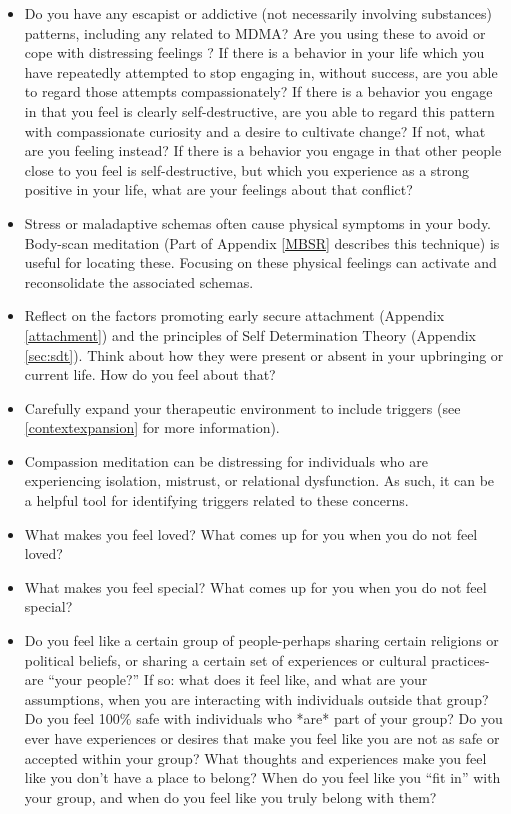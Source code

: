 \documentclass[12pt,letterpaper]{article}
\begin{document}
\begin{itemize}
    \item Do you have any escapist or addictive (not necessarily involving substances) patterns, including any related to MDMA? Are you using these to avoid or cope with distressing feelings \cite{forsterTraumaAddiction,alaviBehavioralAddiction}? If there is a behavior in your life which you have repeatedly attempted to stop engaging in, without success, are you able to regard those attempts compassionately? If there is a behavior you engage in that you feel is clearly self-destructive, are you able to regard this pattern with compassionate curiosity and a desire to cultivate change? If not, what are you feeling instead? If there is a behavior you engage in that other people close to you feel is self-destructive, but which you experience as a strong positive in your life, what are your feelings about that conflict?
    \item Stress or maladaptive schemas often cause physical symptoms in your body. Body-scan meditation (Part of Appendix \ref{MBSR} describes this technique) is useful for locating these. Focusing on these physical feelings can activate and reconsolidate the associated schemas.
    \item Reflect on the factors promoting early secure attachment (Appendix \ref{attachment}) and the principles of Self Determination Theory (Appendix \ref{sec:sdt}). Think about how they were present or absent in your upbringing or current life. How do you feel about that? 
    \item Carefully expand your therapeutic environment to include triggers (see \ref{contextexpansion} for more information).
    \item Compassion meditation can be distressing for individuals who are experiencing isolation, mistrust, or relational dysfunction. As such, it can be a helpful tool for identifying triggers related to these concerns. 
    \item What makes you feel loved? What comes up for you when you do not feel loved?
    \item What makes you feel special? What comes up for you when you do not feel special?
    \item Do you feel like a certain group of people-perhaps sharing certain religions or political beliefs, or sharing a certain set of experiences or cultural practices-are “your people?”  If so: what does it feel like, and what are your assumptions, when you are interacting with individuals outside that group? Do you feel 100\% safe with individuals who *are* part of your group? Do you ever have experiences or desires that make you feel like you are not as safe or accepted within your group? What thoughts and experiences make you feel like you don’t have a place to belong? When do you feel like you “fit in” with your group, and when do you feel like you truly belong with them?

\end{itemize}
\end{document}
